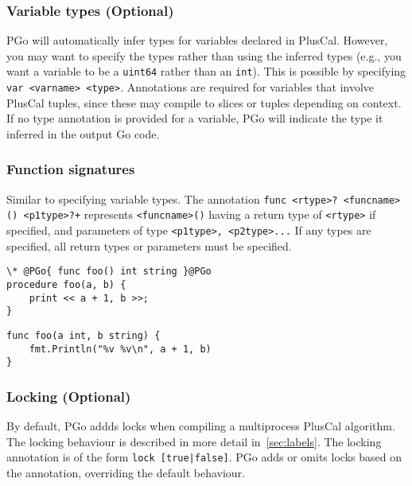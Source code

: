 \subsubsection{Variable types (Optional)}
PGo will automatically infer types for variables declared in PlusCal. However, you may want to specify the types rather than using the inferred types (e.g., you want a variable to be a \texttt{uint64} rather than an \texttt{int}). This is possible by specifying \texttt{var <varname> <type>}. Annotations are required for variables that involve PlusCal tuples, since these may compile to slices or tuples depending on context. If no type annotation is provided for a variable, PGo will indicate the type it inferred in the output Go code.

\subsubsection{Function signatures}
Similar to specifying variable types. The annotation \texttt{func <rtype>? <funcname>() <p1type>?+} represents \texttt{<funcname>()} having a return type of \texttt{<rtype>} if specified, and parameters of type \texttt{<p1type>, <p2type>...} If any types are specified, all return types or parameters must be specified.

\noindent\begin{minipage}{\textwidth}
\begin{lstlisting}[language=pcal]
\* @PGo{ func foo() int string }@PGo
procedure foo(a, b) {
	print << a + 1, b >>;
}
\end{lstlisting}
\end{minipage}

\noindent\begin{minipage}{\textwidth}
\begin{lstlisting}[language=golang]
func foo(a int, b string) {
	fmt.Println("%v %v\n", a + 1, b)
}
\end{lstlisting}
\end{minipage}

\subsubsection{Locking (Optional)}
By default, PGo addds locks when compiling a multiprocess PlusCal algorithm. The locking behaviour is described in more detail in~\ref{sec:labels}. The locking annotation is of the form \texttt{lock [true|false]}. PGo adds or omits locks based on the annotation, overriding the default behaviour.
